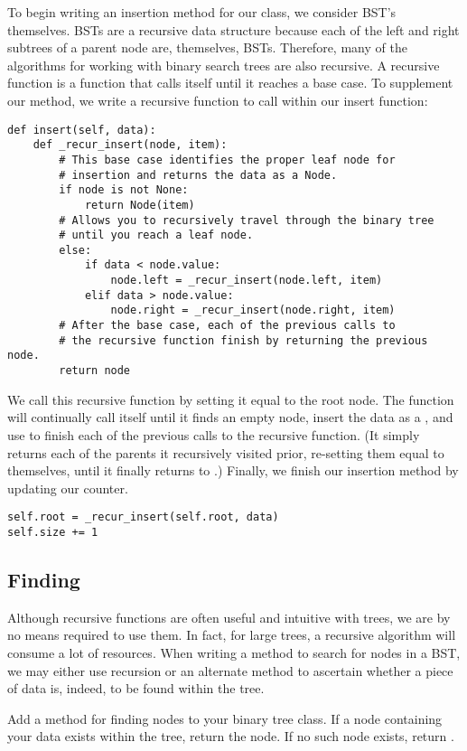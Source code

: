 To begin writing an insertion method for our  class, we consider BST's themselves.
BSTs are a recursive data structure because each of the left and right subtrees of a parent node are, themselves, BSTs.
Therefore, many of the algorithms for working with binary search trees are also recursive.
A recursive function is a function that calls itself until it reaches a base case.
To supplement our  method, we write a recursive function to call within our insert function:
\begin{lstlisting}
def insert(self, data):
    def _recur_insert(node, item):
        # This base case identifies the proper leaf node for
        # insertion and returns the data as a Node.
        if node is not None:
            return Node(item)
        # Allows you to recursively travel through the binary tree
        # until you reach a leaf node.
        else:
            if data < node.value:
                node.left = _recur_insert(node.left, item)
            elif data > node.value:
                node.right = _recur_insert(node.right, item)
        # After the base case, each of the previous calls to
        # the recursive function finish by returning the previous node.
        return node
\end{lstlisting}
We call this recursive function by setting it equal to the root node.
The function will continually call itself until it finds an empty node, insert the data as a , and use  to finish each of the previous calls to the recursive function. (It simply returns each of the parents it recursively visited prior, re-setting them equal to themselves, until it finally returns to .)
Finally, we finish our insertion method by updating our counter.
\begin{lstlisting}
self.root = _recur_insert(self.root, data)
self.size += 1
\end{lstlisting}


\subsection*{Finding}
Although recursive functions are often useful and intuitive with trees, we  are by no means required to use them. In fact, for large trees, a recursive algorithm will consume a lot of resources. When writing a method to search for nodes in a BST, we may either use recursion or an alternate method to ascertain whether a piece of data is, indeed, to be found within the tree.

\begin{problem}
Add a method for finding nodes to your binary tree class. If a node containing your data exists within the tree, return the node. If no such node exists, return .
\label{Finding Nodes}
\end{problem}


